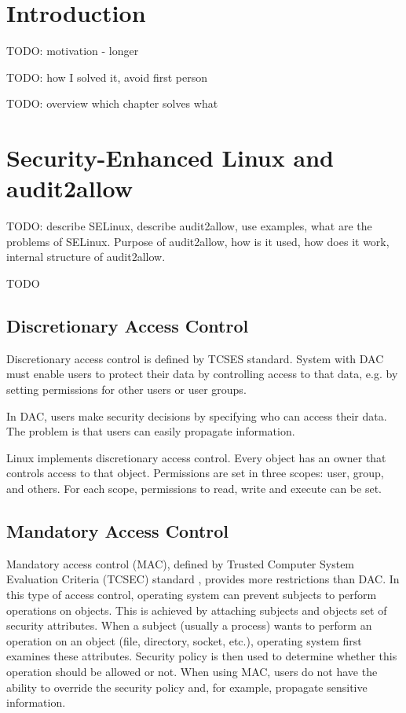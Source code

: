 \chapter{Introduction}
TODO: motivation - longer

TODO: how I solved it, avoid first person

TODO: overview which chapter solves what

\chapter{Security-Enhanced Linux and audit2allow}
TODO: describe SELinux, describe audit2allow, use examples, what are the problems of SELinux. Purpose of audit2allow, how is it used, how does it work, internal structure of audit2allow.

TODO \cite{tsn}

\section{Discretionary Access Control}
Discretionary access control is defined by TCSES standard. System with DAC must enable users to protect their data by controlling access to that data, e.g. by setting permissions for other users or user groups.

In DAC, users make security decisions by specifying who can access their data. The problem is that users can easily propagate information.

Linux implements discretionary access control. Every object has an owner that controls access to that object. Permissions are set in three scopes: user, group, and others. For each scope, permissions to read, write and execute can be set.

\section{Mandatory Access Control}
Mandatory access control (MAC), defined by Trusted Computer System Evaluation
Criteria (TCSEC) standard \cite{orangebook}, provides more restrictions than DAC. In this type of access control, operating system can prevent subjects to perform operations on objects. This is achieved by attaching subjects and objects set of security attributes. When a subject (usually a process) wants to perform an operation on an object (file, directory, socket, etc.), operating system first examines these attributes. Security policy is then used to determine whether this operation should be allowed or not. When using MAC, users do not have the ability to override the security policy and, for example, propagate sensitive information.

